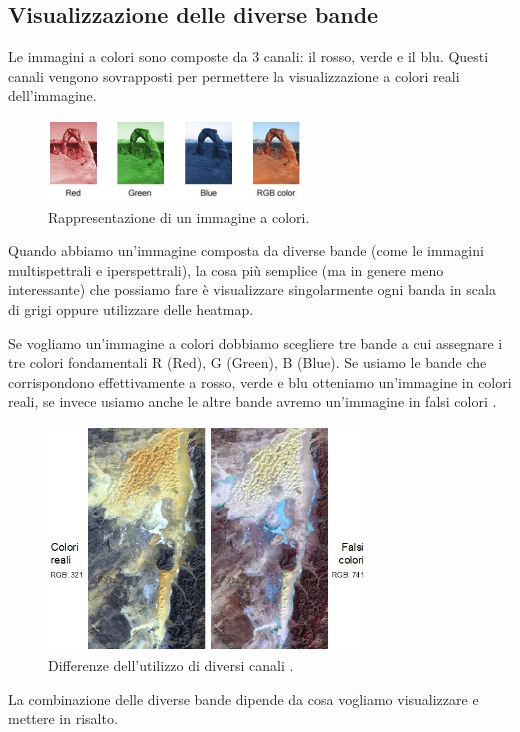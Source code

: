  










\subsection{Visualizzazione delle diverse bande}

Le immagini a colori sono composte da 3 canali: il rosso, verde e il blu. Questi canali
vengono sovrapposti per permettere la visualizzazione a colori reali dell'immagine.

\begin{figure}[H]
    \centering
    \includegraphics[width=0.60\textwidth]{Immagini/Generiche/canali_rgb.png}
    \caption{Rappresentazione di un immagine a colori.}
\end{figure}

Quando abbiamo un'immagine composta da diverse bande (come le immagini multispettrali e 
iperspettrali), la cosa più semplice (ma in genere meno interessante) che possiamo fare 
è visualizzare singolarmente ogni banda in scala di grigi oppure utilizzare delle heatmap. 

Se vogliamo un'immagine a colori dobbiamo scegliere tre bande a cui assegnare i tre 
colori fondamentali R (Red), G (Green), B (Blue). Se usiamo le bande che corrispondono 
effettivamente a rosso, verde e blu otteniamo un'immagine in colori reali, se invece 
usiamo anche le altre bande avremo un'immagine in falsi colori \cite{immagini_multispettrali_a_colori}.

\begin{figure}[H]
    \centering
    \includegraphics[width=0.75\textwidth]{Immagini/Generiche/paragone_bande.png}
    \caption{Differenze dell'utilizzo di diversi canali \cite{immagini_multispettrali_a_colori} .}
\end{figure}

La combinazione delle diverse bande dipende da cosa vogliamo visualizzare e 
mettere in risalto.